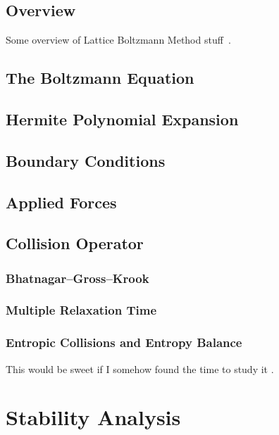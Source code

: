 \documentclass{article}
\begin{document}
\subsection{Overview}

Some overview of Lattice Boltzmann Method stuff~\cite{grasinger2015simulation}.

\subsection{The Boltzmann Equation}

\subsection{Hermite Polynomial Expansion}

\subsection{Boundary Conditions}

\subsection{Applied Forces}

\subsection{Collision Operator}

\subsubsection{Bhatnagar--Gross--Krook}

\subsubsection{Multiple Relaxation Time}

\subsubsection{Entropic Collisions and Entropy Balance}

{\color{red} This would be sweet if I somehow found the time to study it \cite{gorban2014enhancement}.}

\section{Stability Analysis}
\end{document}
